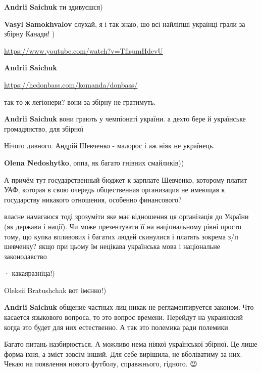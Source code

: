 \begin{itemize}
\begin{itemize}
\textbf{Andrii Saichuk} ти здивуєшся)

\textbf{Vasyl Samokhvalov} слухай, я і так знаю, шо всі найліпші українці грали за збірну Канади! )\par
\url{https://www.youtube.com/watch?v=TflsumHdevU}

\textbf{Andrii Saichuk} 

\url{https://hcdonbass.com/komanda/donbass/}

так то ж легіонери? вони за збірну не гратимуть.

\textbf{Andrii Saichuk} вони грають у чемпіонаті україни. а дехто бере й
українське громадянство, для збірної

\end{itemize}

Нічого дивного. Андрій Шевченко - малорос і аж ніяк не українець.

\textbf{Olena Nedoshytko}, оппа, як багато гнівних смайликів))


А причём тут государственный бюджет к зарплате Шевченко, которому платит УАФ,
которая в свою очередь общественная организация не имеющая к государству
никакого отношения, особенно финансового?

\begin{itemize}

власне намагаюся тоді зрозуміти яке має відношення ця організація до України
(як держави і нації). Чи може презентувати її на національному рівні просто
тому, що купка впливових і багатих людей скинулися і платять зокрема з/п
шевченку? якщо при цьому їм нецікава українська мова і національне
законодавство 🤷

  · 
какаяразніца!)

Oleksii Bratushchak вот імєнно!)

\textbf{Andrii Saichuk} общение частных лиц никак не регламентируется законом. Что касается языкового вопроса, то это вопрос времени. Перейдут на украинский когда это будет для них естественно. А так это полемика ради полемики

Багато питань назбирюється.
А можливо нема ніякої української збірної. Це лише форма їхня, а зміст зовсім інший.
Для себе вирішила, не вболіватиму за них. Чекаю на появлення нового футболу, справжнього, гідного.
😉


\end{itemize}
\end{itemize}
